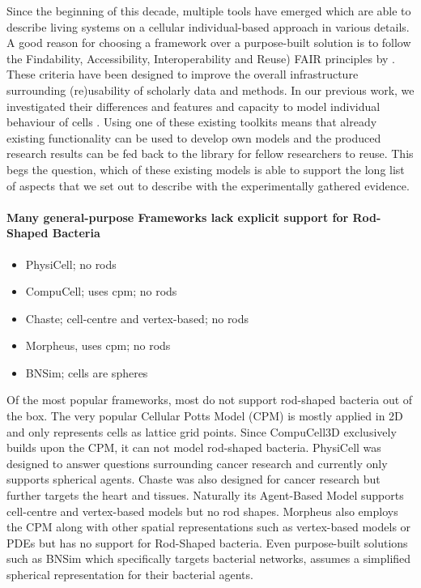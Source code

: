 \documentclass{article}
\begin{document}
Since the beginning of this decade, multiple tools have emerged which are able to describe living
systems on a cellular individual-based approach in various details.
A good reason for choosing a framework over a purpose-built solution is to follow the Findability,
Accessibility, Interoperability and Reuse) FAIR principles by \cite{Wilkinson2016}.
These criteria have been designed to improve the overall infrastructure surrounding (re)usability of
scholarly data and methods.
In our previous work, we investigated their differences and features and capacity to model
individual behaviour of cells \cite{Pleyer2023}.
Using one of these existing toolkits means that already existing functionality can be used to
develop own models and the produced research results can be fed back to the library for fellow
researchers to reuse.
This begs the question, which of these existing models is able to support the long list of aspects
that we set out to describe with the experimentally gathered evidence.

\paragraph{Many general-purpose Frameworks lack explicit support for Rod-Shaped Bacteria}

\begin{itemize}
    \item \cite{Ghaffarizadeh2018} PhysiCell; no rods
    \item \cite{Swat2012} CompuCell; uses \ac{cpm}; no rods
    \item \cite{Cooper2020} Chaste; cell-centre and vertex-based; no rods
    \item \cite{Starru2014} Morpheus, uses \ac{cpm}; no rods
    \item \cite{Wei2013} BNSim; cells are spheres
\end{itemize}

Of the most popular frameworks, most do not support rod-shaped bacteria out of the box.
The very popular Cellular Potts Model (CPM) \cite{Graner1992} is mostly applied in 2D and only
represents cells as lattice grid points.
Since CompuCell3D \cite{Swat2012} exclusively builds upon the CPM, it can not model rod-shaped
bacteria.
PhysiCell \cite{Ghaffarizadeh2018} was designed to answer questions surrounding cancer research and
currently only supports spherical agents.
Chaste \cite{Cooper2020} was also designed for cancer research but further targets the heart and
tissues.
Naturally its Agent-Based Model supports cell-centre and vertex-based models but no rod shapes.
Morpheus \cite{Starru2014} also employs the CPM along with other spatial representations such as
vertex-based models or PDEs but has no support for Rod-Shaped bacteria.
Even purpose-built solutions such as BNSim \cite{Wei2013} which specifically targets bacterial
networks, assumes a simplified spherical representation for their bacterial agents.
\end{document}
